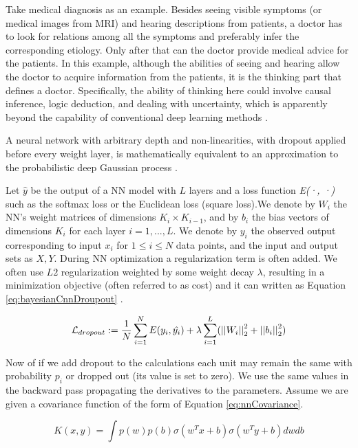 \documentclass[a4paper,fleqn]{cas-dc}
\begin{document}
Take medical diagnosis as an example. Besides seeing
visible symptoms (or medical images from MRI) and hearing descriptions from patients, a doctor has to look for relations among all the symptoms and preferably infer the corresponding etiology. Only after that can the doctor provide medical advice for the patients. In this example, although the abilities of seeing and hearing allow the doctor to acquire information from the patients, it is the thinking part that defines a doctor. Specifically, the ability of thinking here could involve causal inference, logic deduction, and dealing with uncertainty, which is apparently beyond the capability of conventional deep learning methods \cite{Wang2016}.

A neural network with arbitrary depth and non-linearities, with dropout applied before every weight layer, is mathematically equivalent to an approximation to the probabilistic deep Gaussian process \cite{Gal2016}.

Let $\hat{y}$ be the output of a NN model with $L$ layers and a loss function {\it E(·, ·)} such as the softmax loss or the Euclidean loss (square loss).We denote by $W_i$ the NN’s weight matrices of dimensions $K_i \times K_{i-1}$, and by $b_i$ the bias vectors of dimensions $K_i$ for each layer $i = 1, ..., L$. We denote by $y_i$ the observed output corresponding to input $x_i$ for $1 \leq i \leq N$ data points, and the input and output sets as $X, Y$. During NN optimization a regularization term is often added. We often use $L2$ regularization weighted by some weight decay $\lambda$, resulting in a minimization objective (often referred to as cost) and it can written as Equation  \eqref{eq:bayesianCnnDroupout} \cite{Gal2016}.

\begin{equation}
\mathcal{L}_{dropout} := 
    {1 \over N} \sum_{i=1}^{N} E(y_i , \hat{y_i}) + \\
    \lambda \sum_{i=1}^{L} ( \left|\left| W_i \right|\right|_2^2 + \left|\left| b_i \right|\right|_2^2 )
\label{eq:bayesianCnnDroupout} 
\end{equation}

Now of if we add dropout to the calculations each unit may remain the same with probability $p_i$ or dropped out (its value is set to zero). We use the same values in the backward pass propagating the derivatives to the parameters. Assume we are given a covariance function of the form of Equation \eqref{eq:nnCovariance}.

\begin{equation}
K(x, y) = \int p(w)p(b) \sigma (w^T x + b) \sigma (w^T y + b) dw db
\label{eq:nnCovariance}
\end{equation}
\end{document}
